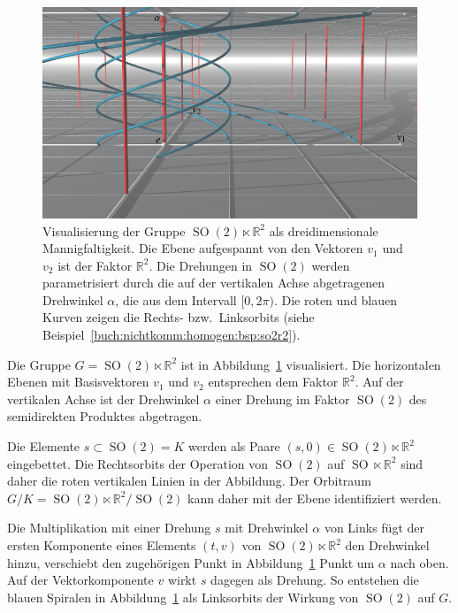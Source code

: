 \begin{beispiel}
\label{buch:nichtkomm:homogen:bsp:so2r2}
\begin{figure}
\centering
\includegraphics{chapters/070-nichtkomm/images/so2r2.pdf}
\caption{Visualisierung der Gruppe $\operatorname{SO}(2)\ltimes \mathbb{R}^2$
als dreidimensionale Mannigfaltigkeit.
Die Ebene aufgespannt von den Vektoren $v_1$ und $v_2$ ist der Faktor
$\mathbb{R}^2$.
Die Drehungen in $\operatorname{SO}(2)$ werden parametrisiert durch
die auf der vertikalen Achse abgetragenen Drehwinkel $\alpha$, die 
aus dem Intervall $[0,2\pi)$.
Die roten und blauen Kurven zeigen die Rechts- bzw.~Linksorbits
(siehe Beispiel~\ref{buch:nichtkomm:homogen:bsp:so2r2}).
\label{buch:nichtkomm:homogen:fig:so2r2}}
\end{figure}
Die Gruppe $G=\operatorname{SO}(2)\ltimes \mathbb{R}^2$ ist in 
Abbildung~\ref{buch:nichtkomm:homogen:fig:so2r2} visualisiert.
Die horizontalen Ebenen mit Basisvektoren $v_1$ und $v_2$ 
entsprechen dem Faktor $\mathbb{R}^2$.
Auf der vertikalen Achse ist der Drehwinkel $\alpha$ einer Drehung
im Faktor $\operatorname{SO}(2)$ des semidirekten Produktes abgetragen.

Die Elemente $s\subset \operatorname{SO}(2)=K$ werden als Paare
$(s,0)\in \operatorname{SO}(2)\ltimes\mathbb{R}^2$ eingebettet.
Die Rechtsorbits der Operation von $\operatorname{SO}(2)$ auf
$\operatorname{SO}\ltimes \mathbb{R}^2$ sind daher die roten vertikalen
Linien in der Abbildung.
Der Orbitraum
$G/K
=
\operatorname{SO}(2)\ltimes\mathbb{R}^2/\operatorname{SO}(2)$
kann daher mit der Ebene identifiziert werden.

Die Multiplikation mit einer Drehung $s$ mit Drehwinkel $\alpha$ von
Links fügt der ersten Komponente eines Elements $(t,v)$ von
$\operatorname{SO}(2)\ltimes\mathbb{R}^2$ den Drehwinkel hinzu, 
verschiebt den zugehörigen Punkt in
Abbildung~\ref{buch:nichtkomm:homogen:fig:so2r2}
Punkt um $\alpha$ nach oben.
Auf der Vektorkomponente $v$ wirkt $s$ dagegen als Drehung.
So entstehen die blauen Spiralen in
Abbildung~\ref{buch:nichtkomm:homogen:fig:so2r2}
als
Linksorbits der Wirkung von $\operatorname{SO}(2)$ auf $G$.
\end{beispiel}

